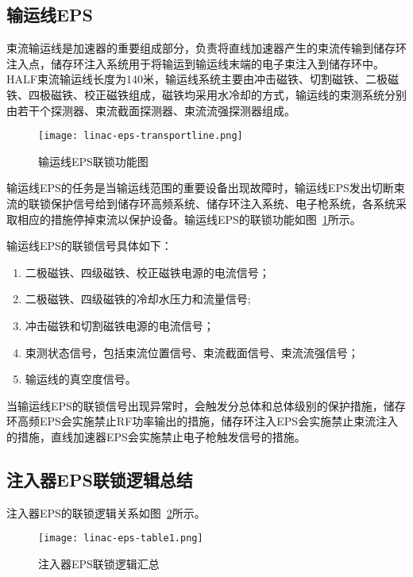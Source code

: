 \subsection{输运线EPS}
束流输运线是加速器的重要组成部分，负责将直线加速器产生的束流传输到储存环注入点，储存环注入系统用于将输运到输运线末端的电子束注入到储存环中。HALF束流输运线长度为140米，输运线系统主要由冲击磁铁、切割磁铁、二极磁铁、四极磁铁、校正磁铁组成，磁铁均采用水冷却的方式，输运线的束测系统分别由若干个探测器、束流截面探测器、束流流强探测器组成。

\begin{figure}[!htb]
	\centering
	\texttt{[image: linac-eps-transportline.png]}
	\caption{输运线EPS联锁功能图}
	\label{fig:linac-eps-transportline}
\end{figure}

输运线EPS的任务是当输运线范围的重要设备出现故障时，输运线EPS发出切断束流的联锁保护信号给到储存环高频系统、储存环注入系统、电子枪系统，各系统采取相应的措施停掉束流以保护设备。输运线EPS的联锁功能如图~\ref{fig:linac-eps-transportline}所示。

输运线EPS的联锁信号具体如下：
\begin{enumerate}
  \item 二极磁铁、四级磁铁、校正磁铁电源的电流信号；

  \item 二极磁铁、四级磁铁的冷却水压力和流量信号;

  \item 冲击磁铁和切割磁铁电源的电流信号；

  \item 束测状态信号，包括束流位置信号、束流截面信号、束流流强信号；

  \item 输运线的真空度信号。
\end{enumerate}

当输运线EPS的联锁信号出现异常时，会触发分总体和总体级别的保护措施，储存环高频EPS会实施禁止RF功率输出的措施，储存环注入EPS会实施禁止束流注入的措施，直线加速器EPS会实施禁止电子枪触发信号的措施。

\subsection{注入器EPS联锁逻辑总结}

注入器EPS的联锁逻辑关系如图~\ref{fig:linac-eps-table1}所示。

\begin{figure}[!htb]
	\centering
	\texttt{[image: linac-eps-table1.png]}
	\caption{注入器EPS联锁逻辑汇总}
	\label{fig:linac-eps-table1}
\end{figure}

